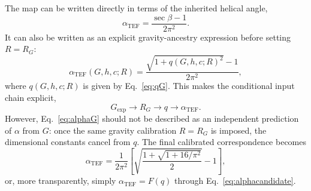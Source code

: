 \documentclass[10pt,twocolumn]{article}
\newcommand{\TEF}{\mathrm{TEF}}
\newcommand{\Exp}{\mathrm{exp}}
\begin{document}
The map can be written directly in terms of the inherited helical angle,
\begin{equation}
\boxed{
\alpha_{\TEF}=\frac{\sec\beta-1}{2\pi^2}.
}
\label{eq:alphabeta}
\end{equation}
It can also be written as an explicit gravity-ancestry expression before setting $R=R_G$:
\begin{equation}
\boxed{
\alpha_{\TEF}(G,h,c;R)
=\frac{\sqrt{1+q(G,h,c;R)^2}-1}{2\pi^2},
}
\label{eq:alphaG}
\end{equation}
where $q(G,h,c;R)$ is given by Eq.~\eqref{eq:qG}.  This makes the conditional input chain explicit,
\begin{equation}
G_{\Exp}\longrightarrow R_G\longrightarrow q\longrightarrow\alpha_{\TEF}.
\label{eq:chain}
\end{equation}
However, Eq.~\eqref{eq:alphaG} should not be described as an independent prediction of $\alpha$ from
$G$: once the same gravity calibration $R=R_G$ is imposed, the dimensional constants cancel from
$q$.  The final calibrated correspondence becomes
\begin{equation}
\boxed{
\alpha_{\TEF}
=\frac{1}{2\pi^2}
\left[
\sqrt{\frac{1+\sqrt{1+16/\pi^2}}{2}}-1
\right],
}
\label{eq:alphapi}
\end{equation}
or, more transparently, simply $\alpha_{\TEF}=F(q)$ through
Eq.~\eqref{eq:alphacandidate}.
\end{document}
